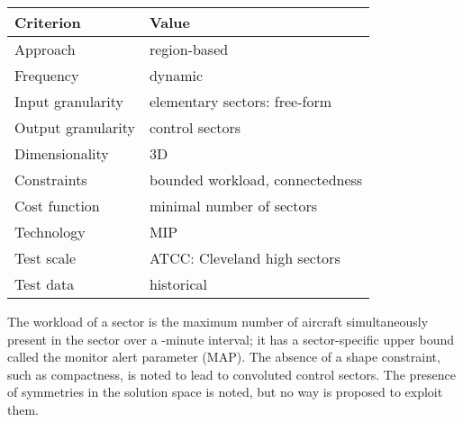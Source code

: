\documentclass[a4paper,12pt]{article}
\begin{document}
\begin{center}
\begin{tabular}{|l|l|}
  \hline
  Criterion & Value \\
  \hline\hline
  Approach & region-based \\ \hline
  Frequency & dynamic \\ \hline
  Input granularity & elementary sectors: free-form \\ \hline
  Output granularity & control sectors \\ \hline
  Dimensionality & 3D \\ \hline
  Constraints & bounded workload, connectedness \\ \hline
  Cost function & minimal number of sectors \\ \hline
  Technology & MIP \\ \hline
  Test scale & ATCC: Cleveland high sectors \\ \hline
  Test data & historical \\ \hline
\end{tabular}
\end{center}
The workload of a sector is the maximum number of aircraft
simultaneously present in the sector over a -minute interval; it
has a sector-specific upper bound called the monitor alert parameter
(MAP).  The absence of a shape constraint, such as compactness, is
noted to lead to convoluted control sectors.  The presence of
symmetries in the solution space is noted, but no way is proposed to
exploit them.

\subsection{\cite{Leiden:ATIO09}}
\end{document}
